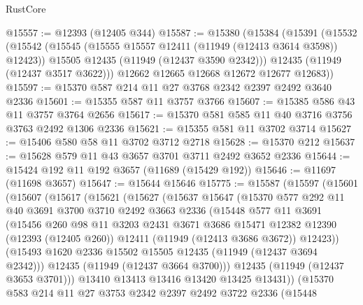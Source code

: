 \begin{lexlean}{RustCore}
\begin{coremodule}
@15557 := @12393 (@12405 @344)
@15587 := @15380
    (@15384
      (@15391
        (@15532
          (@15542
            (@15545 (@15555 @15557 @12411 (@11949 (@12413 @3614 @3598)) @12423))
            @15505
            @12435
            (@11949 (@12437 @3590 @2342)))
          @12435
          (@11949 (@12437 @3517 @3622)))
        @12662
        @12665
        @12668
        @12672
        @12677
        @12683))
@15597 := @15370 @587 @214 @11 @27 @3768 @2342 @2397 @2492 @3640 @2336
@15601 := @15355 @587 @11 @3757 @3766
@15607 := @15385 @586 @43 @11 @3757 @3764 @2656
@15617 := @15370 @581 @585 @11 @40 @3716 @3756 @3763 @2492 @1306 @2336
@15621 := @15355 @581 @11 @3702 @3714
@15627 := @15406 @580 @58 @11 @3702 @3712 @2718
@15628 := @15370 @212
@15637 := @15628 @579 @11 @43 @3657 @3701 @3711 @2492 @3652 @2336
@15644 := @15424 @192 @11 @192 @3657 (@11689 (@15429 @192))
@15646 := @11697 (@11698 @3657)
@15647 := @15644 @15646
@15775 := @15587
    (@15597
      (@15601
        (@15607
          (@15617
            (@15621
              (@15627
                (@15637
                  @15647
                  (@15370
                    @577
                    @292
                    @11
                    @40
                    @3691
                    @3700
                    @3710
                    @2492
                    @3663
                    @2336
                    (@15448
                      @577
                      @11
                      @3691
                      (@15456
                        @260
                        @98
                        @11
                        @3203
                        @2431
                        @3671
                        @3686
                        @15471
                        @12382
                        @12390
                        (@12393 (@12405 @260))
                        @12411
                        (@11949 (@12413 @3686 @3672))
                        @12423))
                    (@15493 @1620 @2336 @15502 @15505 @12435 (@11949 (@12437 @3694 @2342)))
                    @12435
                    (@11949 (@12437 @3664 @3700)))
                  @12435
                  (@11949 (@12437 @3653 @3701)))
                @13410
                @13413
                @13416
                @13420
                @13425
                @13431))
            (@15370
              @583
              @214
              @11
              @27
              @3753
              @2342
              @2397
              @2492
              @3722
              @2336
              (@15448

\end{coremodule}
\end{lexlean}
